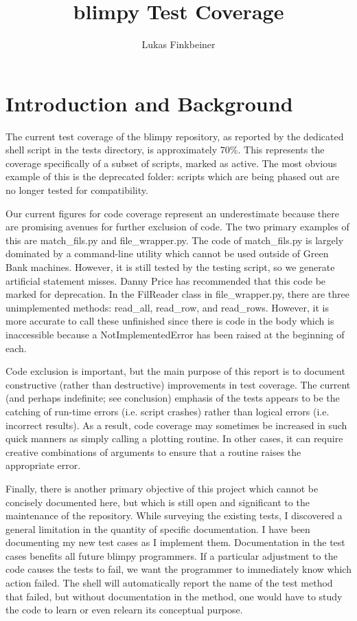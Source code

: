 \documentclass[12pt]{article}
\title{blimpy Test Coverage}
\author{Lukas Finkbeiner}
\begin{document}
\maketitle

\section{Introduction and Background}

\quad \quad The current test coverage of the blimpy repository, as reported by the dedicated shell script in the tests directory, is approximately 70\%. This represents the coverage specifically of a subset of scripts, marked as active. The most obvious example of this is the deprecated folder: scripts which are being phased out are no longer tested for compatibility. 

Our current figures for code coverage represent an underestimate because there are promising avenues for further exclusion of code. The two primary examples of this are match\_fils.py and file\_wrapper.py. The code of match\_fils.py is largely dominated by a command-line utility which cannot be used outside of Green Bank machines. However, it is still tested by the testing script, so we generate artificial statement misses. Danny Price has recommended that this code be marked for deprecation. In the FilReader class in file\_wrapper.py, there are three unimplemented methods: read\_all, read\_row, and read\_rows. However, it is more accurate to call these unfinished since there is code in the body which is inaccessible because a NotImplementedError has been raised at the beginning of each.

Code exclusion is important, but the main purpose of this report is to document constructive (rather than destructive) improvements in test coverage. The current (and perhaps indefinite; see conclusion) emphasis of the tests appears to be the catching of run-time errors (i.e. script crashes) rather than logical errors (i.e. incorrect results). As a result, code coverage may sometimes be increased in such quick manners as simply calling a plotting routine. In other cases, it can require creative combinations of arguments to ensure that a routine raises the appropriate error.

Finally, there is another primary objective of this project which cannot be concisely documented here, but which is still open and significant to the maintenance of the repository. While surveying the existing tests, I discovered a general limitation in the quantity of specific documentation. I have been documenting my new test cases as I implement them. Documentation in the test cases benefits all future blimpy programmers. If a particular adjustment to the code causes the tests to fail, we want the programmer to immediately know which action failed. The shell will automatically report the name of the test method that failed, but without documentation in the method, one would have to study the code to learn or even relearn its conceptual purpose.
\end{document}
